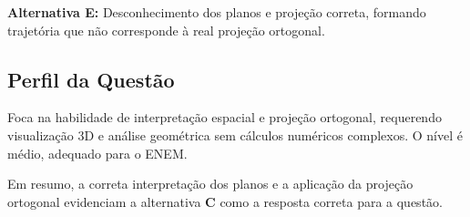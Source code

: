 \documentclass{article}
\begin{document}
\textbf{Alternativa E:} Desconhecimento dos planos e projeção correta, formando trajetória que não corresponde à real projeção ortogonal.

\subsection*{Perfil da Questão}

Foca na habilidade de interpretação espacial e projeção ortogonal, requerendo visualização 3D e análise geométrica sem cálculos numéricos complexos. O nível é médio, adequado para o ENEM.

\bigskip

Em resumo, a correta interpretação dos planos e a aplicação da projeção ortogonal evidenciam a alternativa \textbf{C} como a resposta correta para a questão.
\end{document}

